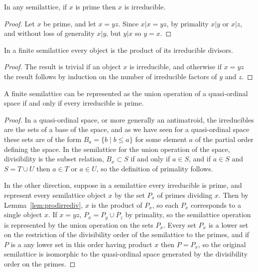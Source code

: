 \documentclass[11pt]{llncs}
\begin{document}
{\begin{lemma}
In any semilattice, if $x$ is prime then $x$ is irreducible.
\end{lemma}

\begin{proof}
Let $x$ be prime, and let $x=yz$. Since $x|x=yz$, by primality $x|y$ or $x|z$, and without loss of generality $x|y$, but $y|x$ so $y=x$.
\end{proof}

\begin{lemma}
\label{lem:prodirrediv}
In a finite semilattice every object is the product of its irreducible divisors.
\end{lemma}

\begin{proof}
The result is trivial if an object $x$ is irreducible, and otherwise if $x=yz$ the result follows by induction on the number of irreducible factors of $y$ and $z$.
\end{proof}

\begin{theorem}
A finite semilattice can be represented as the union operation of a quasi-ordinal space if and only if every irreducible is prime.
\end{theorem}

\begin{proof}
In a quasi-ordinal space, or more generally an antimatroid, the irreducibles are the sets of a base of the space, and as we have seen for a quasi-ordinal space these sets are of the form $B_a=\{b\mid b\le a\}$ for some element $a$ of the partial order defining the space. In the semilattice for the union operation of the space, divisibility is the subset relation, $B_x\subset S$ if and only if $a\in S$, and if $a\in S$ and $S=T\cup U$ then $a\in T$ or $a\in U$, so the definition of primality follows.

In the other direction, suppose in a semilattice every irreducible is prime, and represent every semilattice object $x$ by the set $P_x$ of primes dividing $x$. Then by Lemma~\ref{lem:prodirrediv}, $x$ is the product of $P_x$, so each $P_x$ corresponds to a single object $x$.  If $x=yz$, $P_x=P_y\cup P_z$ by primality, so the semilattice operation is represented by the union operation on the sets $P_x$. Every set $P_x$ is a lower set on the restriction of the divisibility order of the semilattice to the primes, and if $P$ is a any lower set in this order having product $x$ then $P=P_x$, so the original semilattice is isomorphic to the quasi-ordinal space generated by the divisibility order on the primes.
\end{proof}

}
\end{document}
